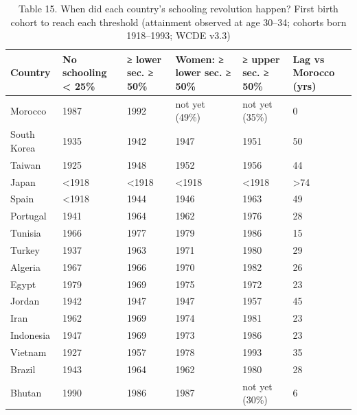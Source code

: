 \begin{table}
\caption{Table 15. When did each country's schooling revolution happen? First birth cohort to reach each threshold (attainment observed at age 30–34; cohorts born 1918–1993; WCDE v3.3)}
\label{tab:T15_birth_cohort_timing}
\begin{tabular}{llllll}
\toprule
Country & No schooling < 25\% & ≥ lower sec. ≥ 50\% & Women: ≥ lower sec. ≥ 50\% & ≥ upper sec. ≥ 50\% & Lag vs Morocco (yrs) \\
\midrule
Morocco & 1987 & 1992 & not yet (49\%) & not yet (35\%) & 0 \\
South Korea & 1935 & 1942 & 1947 & 1951 & 50 \\
Taiwan & 1925 & 1948 & 1952 & 1956 & 44 \\
Japan & <1918 & <1918 & <1918 & <1918 & >74 \\
Spain & <1918 & 1944 & 1946 & 1963 & 49 \\
Portugal & 1941 & 1964 & 1962 & 1976 & 28 \\
Tunisia & 1966 & 1977 & 1979 & 1986 & 15 \\
Turkey & 1937 & 1963 & 1971 & 1980 & 29 \\
Algeria & 1967 & 1966 & 1970 & 1982 & 26 \\
Egypt & 1979 & 1969 & 1975 & 1972 & 23 \\
Jordan & 1942 & 1947 & 1947 & 1957 & 45 \\
Iran & 1962 & 1969 & 1974 & 1981 & 23 \\
Indonesia & 1947 & 1969 & 1973 & 1986 & 23 \\
Vietnam & 1927 & 1957 & 1978 & 1993 & 35 \\
Brazil & 1943 & 1964 & 1962 & 1980 & 28 \\
Bhutan & 1990 & 1986 & 1987 & not yet (30\%) & 6 \\
\bottomrule
\end{tabular}
\end{table}
